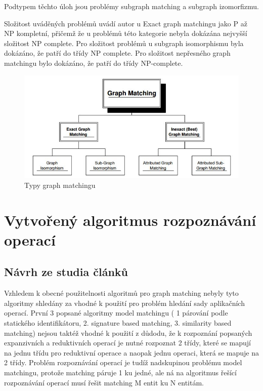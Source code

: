 \documentclass[11pt,twoside,a4paper]{book}
\begin{document}
 Podtypem těchto úloh jsou problémy subgraph matching a subgraph izomorfizmu.
 
 Složitost uváděných problémů uvádí autor u Exact graph matchingu jako P až NP
 kompletní, přičemž že u problémů této kategorie nebyla dokázána nejvyšší
 složitost NP complete. Pro složitost problémů u subgraph isomorphismu byla
 dokázáno, že patří do třídy NP complete. Pro složitost nepřesného graph
 matchingu bylo dokázáno, že patří do třídy NP-complete.
 
 

 
 \begin{figure}[ht]
\begin{center}
\includegraphics[width=15cm]{figures/graph_matching.jpg}
\caption{Typy graph matchingu}
\label{fig:graph_matching}
\end{center}
\end{figure}
 
 
 \section{Vytvořený algoritmus rozpoznávání operací}
 
 \subsection{Návrh ze studia článků}
 
 Vzhledem k obecné použitelnosti algoritmů pro graph matching nebyly tyto
 algoritmy shledány za vhodné k použití pro problém hledání sady
 aplikačních operací. První 3 popsané algoritmy model matchingu ( 1
 párování podle statického identifikátoru, 2. signature based matching, 3.
 similarity based matching) nejsou taktéž vhodné k použití z důdodu, že k
 rozpoznání popsaných expanzivních a reduktivních operací je nutné rozpoznat 2
 třídy, které se mapují na jednu třídu pro reduktivní operace a naopak jednu
 operaci, která se mapuje na 2 třídy. Problém rozpoznávání operací je tudíž
 nadskupinou problému model matchingu, protože matching páruje 1 ku jedné, ale
 ná na algoritmus řešící rozpoznávání operací musí řešit matching M entit ku N entitám.
 
\end{document}
